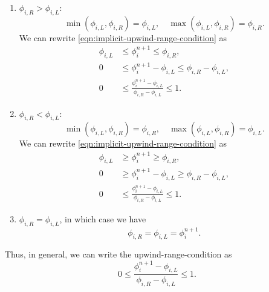 \documentclass[../thesis.tex]{subfiles}
\begin{document}
\begin{enumerate}
    \item \(\phi_{i,R} > \phi_{i,L}:\)
        \[\min\left( \phi_{i,L},\phi_{i,R} \right) = \phi_{i,L},\quad
        \max\left( \phi_{i,L},\phi_{i,R} \right) = \phi_{i,R}.\]
        We can rewrite \eqref{eqn:implicit-upwind-range-condition} as
        \begin{equation*}
            \begin{split}
                \phi_{i,L}
                &\leq
                \phi_{i}^{n+1}
                \leq
                \phi_{i,R},
                \\
                0
                &\leq
                \phi_{i}^{n+1} - \phi_{i,L}
                \leq
                \phi_{i,R} - \phi_{i,L},
                \\
                0
                &\leq
                \frac{\phi_{i}^{n+1} - \phi_{i,L}}{\phi_{i,R} - \phi_{i,L}}
                \leq
                1.
            \end{split}
        \end{equation*}
    \item \(\phi_{i,R} < \phi_{i,L}:\)
        \[\min\left( \phi_{i,L},\phi_{i,R} \right) = \phi_{i,R},\quad
        \max\left( \phi_{i,L},\phi_{i,R} \right) = \phi_{i,L}.\]
        We can rewrite \eqref{eqn:implicit-upwind-range-condition} as
        \begin{equation*}
            \begin{split}
                \phi_{i,L}
                &\geq
                \phi_{i}^{n+1}
                \geq
                \phi_{i,R},
                \\
                0
                &\geq
                \phi_{i}^{n+1} - \phi_{i,L}
                \geq
                \phi_{i,R} - \phi_{i,L},
                \\
                0
                &\leq
                \frac{\phi_{i}^{n+1} - \phi_{i,L}}{\phi_{i,R} - \phi_{i,L}}
                \leq
                1.
            \end{split}
        \end{equation*}
    \item \(\phi_{i,R} = \phi_{i,L}\), in which case we have\[\phi_{i,R} = \phi_{i,L} = \phi_{i}^{n+1}.\]
\end{enumerate}
Thus, in general, we can write the upwind-range-condition as
\begin{equation}\label{eqn:general upwind-range-condition}
    0
    \leq
    \frac{\phi_{i}^{n+1} - \phi_{i,L}}{\phi_{i,R} - \phi_{i,L}}
    \leq
    1.
\end{equation}
\end{document}

